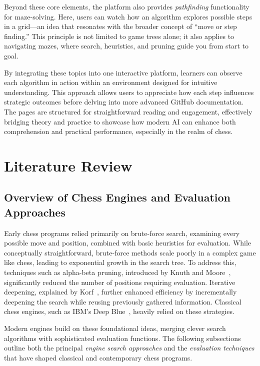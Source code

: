 \documentclass[12pt,a4paper]{article}
\begin{document}
Beyond these core elements, the platform also provides \emph{pathfinding} functionality for maze-solving. Here, users can watch how an algorithm explores possible steps in a grid—an idea that resonates with the broader concept of “move or step finding.” This principle is not limited to game trees alone; it also applies to navigating mazes, where search, heuristics, and pruning guide you from start to goal.

By integrating these topics into one interactive platform, learners can observe each algorithm in action within an environment designed for intuitive understanding. This approach allows users to appreciate how each step influences strategic outcomes before delving into more advanced GitHub documentation. The pages are structured for straightforward reading and engagement, effectively bridging theory and practice to showcase how modern AI can enhance both comprehension and practical performance, especially in the realm of chess.





\section{Literature Review}
\label{sec:lit_review}
\subsection{Overview of Chess Engines and Evaluation Approaches}
Early chess programs relied primarily on brute-force search, examining every possible move and position, combined with basic heuristics for evaluation. While conceptually straightforward, brute-force methods scale poorly in a complex game like chess, leading to exponential growth in the search tree. To address this, techniques such as alpha-beta pruning, introduced by Knuth and Moore~\cite{Knuth1975}, significantly reduced the number of positions requiring evaluation. Iterative deepening, explained by Korf~\cite{Korf1985}, further enhanced efficiency by incrementally deepening the search while reusing previously gathered information. Classical chess engines, such as IBM’s Deep Blue~\cite{Campbell2002DeepBlue}, heavily relied on these strategies. 

Modern engines build on these foundational ideas, merging clever search algorithms with sophisticated evaluation functions. The following subsections outline both the principal \emph{engine search approaches} and the \emph{evaluation techniques} that have shaped classical and contemporary chess programs.
\end{document}
